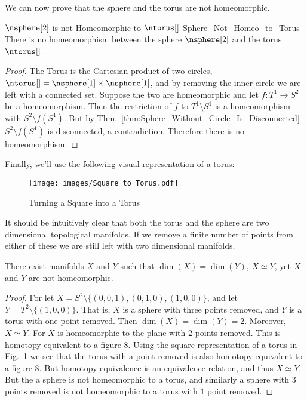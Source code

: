 \documentclass{article}                                                        %
\begin{document}
        We can now prove that the sphere and the torus are not homeomorphic.
        \begin{ltheorem}{$\nsphere[2]$ is not Homeomorphic to $\ntorus[]$}
                        {Sphere_Not_Homeo_to_Torus}
            There is no homeomorphism between the sphere $\nsphere[2]$ and
            the torus $\ntorus[]$.
        \end{ltheorem}
        \begin{proof}
            The Torus is the Cartesian product of two circles,
            $\ntorus[]=\nsphere[1]\times\nsphere[1]$, and by removing the inner
            circle we are left with a connected set. Suppose the two are
            homeomorphic and let $f:T^{1}\rightarrow{S}^{2}$ be a homeomorphism.
            Then the restriction of $f$ to $T^{1}\setminus{S}^{1}$ is a
            homeomorphism with $S^{2}\setminus{f}(S^{1})$. But by
            Thm.~\ref{thm:Sphere_Without_Circle_Is_Disconnected}
            $S^{2}\setminus{f}(S^{1})$ is disconnected, a contradiction.
            Therefore there is no homeomorphism.
        \end{proof}
        Finally, we'll use the following visual representation of a torus:
        \begin{figure}[H]
            \centering
            \captionsetup{type=figure}
            \texttt{[image: images/Square\_to\_Torus.pdf]}
            \caption{Turning a Square into a Torus}
            \label{fig:plane_representation_of_a_torus}
        \end{figure}
        It should be intuitively clear that both the torus and the sphere
        are two dimensional topological manifolds. If we remove a finite
        number of points from either of these we are still left with
        two dimensional manifolds.
        \begin{theorem}
            There exist manifolds $X$ and $Y$ such that
            $\dim(X)=\dim(Y)$, ${X}\simeq{Y}$,
            yet $X$ and $Y$ are not homeomorphic.
        \end{theorem}
        \begin{proof}
            For let $X=S^{2}\setminus\{(0,0,1),(0,1,0),(1,0,0)\}$, and let
            $Y=T^{2}\setminus\{(1,0,0)\}$. That is, $X$ is a sphere with
            three points removed, and $Y$ is a torus with one point removed.
            Then $\dim(X)=\dim(Y)=2$. Moreover, $X\simeq Y$. For $X$ is
            homeomorphic to the plane with $2$ points removed. This is
            homotopy equivalent to a figure $8$. Using the square
            representation of a torus in
            Fig.~\ref{fig:plane_representation_of_a_torus} we see that the
            torus with a point removed is also homotopy equivalent to a
            figure $8$. But homotopy equivalence is an equivalence relation,
            and thus $X\simeq Y$. But the a sphere is not homeomorphic to a
            torus, and similarly a sphere with $3$ points removed is not
            homeomorphic to a torus with $1$ point removed.
        \end{proof}
\end{document}
